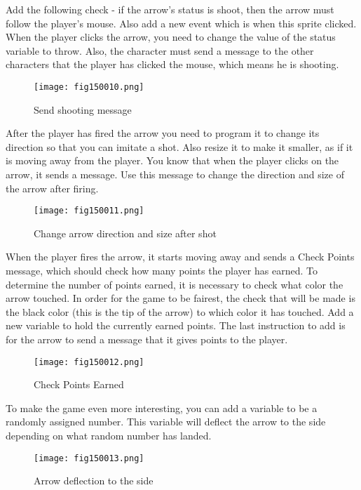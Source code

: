 Add the following check - if the arrow's status is shoot, then the arrow must follow the player's mouse. Also add a new event which is when this sprite clicked. When the player clicks the arrow, you need to change the value of the status variable to throw. Also, the character must send a message to the other characters that the player has clicked the mouse, which means he is shooting.

\begin{figure}[H]
   \centering
   \texttt{[image: fig150010.png]}
   \caption{Send shooting message}
\label{fig150010}
\end{figure}

After the player has fired the arrow you need to program it to change its direction so that you can imitate a shot. Also resize it to make it smaller, as if it is moving away from the player. You know that when the player clicks on the arrow, it sends a message. Use this message to change the direction and size of the arrow after firing.

\begin{figure}[H]
   \centering
   \texttt{[image: fig150011.png]}
   \caption{Change arrow direction and size after shot}
\label{fig150011}
\end{figure}

When the player fires the arrow, it starts moving away and sends a Check Points message, which should check how many points the player has earned. To determine the number of points earned, it is necessary to check what color the arrow touched. In order for the game to be fairest, the check that will be made is the black color (this is the tip of the arrow) to which color it has touched. Add a new variable to hold the currently earned points. The last instruction to add is for the arrow to send a message that it gives points to the player.

\begin{figure}[H]
   \centering
   \texttt{[image: fig150012.png]}
   \caption{Check Points Earned}
\label{fig150012}
\end{figure}

To make the game even more interesting, you can add a variable to be a randomly assigned number. This variable will deflect the arrow to the side depending on what random number has landed.

\begin{figure}[H]
   \centering
   \texttt{[image: fig150013.png]}
   \caption{Arrow deflection to the side}
\label{fig150013}
\end{figure}

